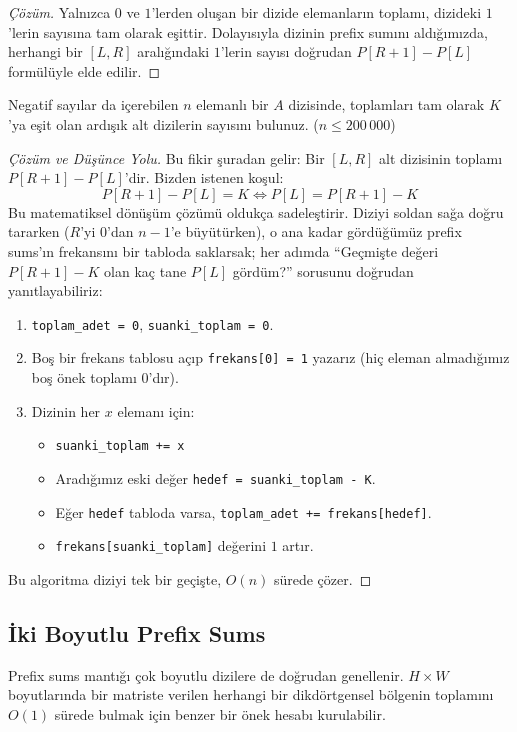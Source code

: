 \begin{proof}[Çözüm]
Yalnızca $0$ ve $1$'lerden oluşan bir dizide elemanların toplamı, dizideki $1$'lerin sayısına tam olarak eşittir. Dolayısıyla dizinin prefix sumını aldığımızda, herhangi bir $[L, R]$ aralığındaki $1$'lerin sayısı doğrudan $P[R+1] - P[L]$ formülüyle elde edilir.
\end{proof}

\begin{example}
Negatif sayılar da içerebilen $n$ elemanlı bir $A$ dizisinde, toplamları tam olarak $K$'ya eşit olan ardışık alt dizilerin sayısını bulunuz. ($n \le 200\,000$)
\end{example}

\begin{proof}[Çözüm ve Düşünce Yolu]
Bu fikir şuradan gelir: Bir $[L, R]$ alt dizisinin toplamı $P[R+1] - P[L]$'dir. Bizden istenen koşul:
\[
P[R+1] - P[L] = K \iff P[L] = P[R+1] - K
\]
Bu matematiksel dönüşüm çözümü oldukça sadeleştirir. Diziyi soldan sağa doğru tararken ($R$'yi $0$'dan $n-1$'e büyütürken), o ana kadar gördüğümüz prefix sums'ın frekansını bir tabloda saklarsak; her adımda ``Geçmişte değeri $P[R+1] - K$ olan kaç tane $P[L]$ gördüm?'' sorusunu doğrudan yanıtlayabiliriz:

\begin{enumerate}
    \item \texttt{toplam\_adet = 0}, \texttt{suanki\_toplam = 0}.
    \item Boş bir frekans tablosu açıp \texttt{frekans[0] = 1} yazarız (hiç eleman almadığımız boş önek toplamı $0$'dır).
    \item Dizinin her $x$ elemanı için:
    \begin{itemize}
        \item \texttt{suanki\_toplam += x}
        \item Aradığımız eski değer \texttt{hedef = suanki\_toplam - K}.
        \item Eğer \texttt{hedef} tabloda varsa, \texttt{toplam\_adet += frekans[hedef]}.
        \item \texttt{frekans[suanki\_toplam]} değerini $1$ artır.
    \end{itemize}
\end{enumerate}
Bu algoritma diziyi tek bir geçişte, $O(n)$ sürede çözer.
\end{proof}

\subsection{İki Boyutlu Prefix Sums}
Prefix sums mantığı çok boyutlu dizilere de doğrudan genellenir. $H \times W$ boyutlarında bir matriste verilen herhangi bir dikdörtgensel bölgenin toplamını $O(1)$ sürede bulmak için benzer bir önek hesabı kurulabilir.

